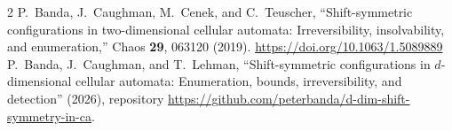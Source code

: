 \documentclass[10pt,twocolumn,letterpaper]{article}
\begin{document}
\begin{thebibliography}{2}
\makeatletter\renewcommand\@biblabel[1]{$^{#1}$}\makeatother
{}
P.~Banda, J.~Caughman, M.~Cenek, and C.~Teuscher, ``Shift-symmetric
configurations in two-dimensional cellular automata: Irreversibility,
insolvability, and enumeration,'' Chaos \textbf{29}, 063120 (2019).
\href{https://doi.org/10.1063/1.5089889}{https://doi.org/10.1063/1.5089889}
P.~Banda, J.~Caughman, and T.~Lehman, ``Shift-symmetric configurations in
$d$-dimensional cellular automata: Enumeration, bounds, irreversibility, and
detection'' (2026), repository
\href{https://github.com/peterbanda/d-dim-shift-symmetry-in-ca}{https://github.com/peterbanda/d-dim-shift-symmetry-in-ca}.
\end{thebibliography}
\end{document}
